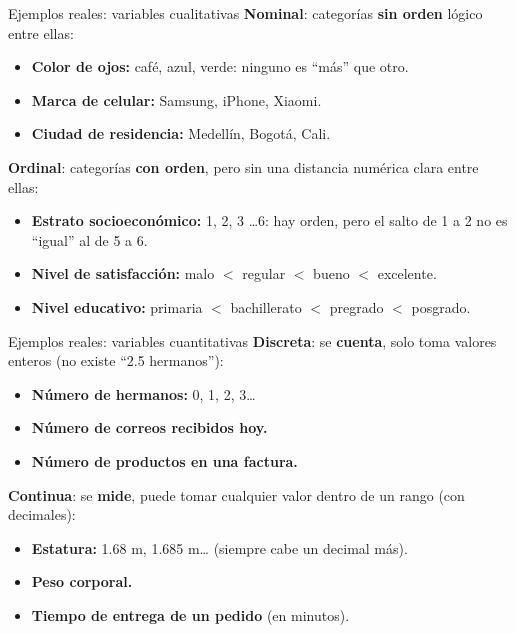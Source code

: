 \documentclass[aspectratio=169,11pt]{beamer}
\begin{document}
\begin{frame}{Ejemplos reales: variables cualitativas}
  \small
  \textcolor{esumerSky}{\textbf{Nominal}}: categorías \textbf{sin orden}
  lógico entre ellas:
  \begin{itemize}
    \small
    \item \textbf{Color de ojos:} café, azul, verde: ninguno es ``más''
      que otro.
    \item \textbf{Marca de celular:} Samsung, iPhone, Xiaomi.
    \item \textbf{Ciudad de residencia:} Medellín, Bogotá, Cali.
  \end{itemize}
  \vspace{0.3cm}
  \textcolor{esumerTeal}{\textbf{Ordinal}}: categorías \textbf{con
  orden}, pero sin una distancia numérica clara entre ellas:
  \begin{itemize}
    \small
    \item \textbf{Estrato socioeconómico:} 1, 2, 3 \dots 6: hay orden,
      pero el salto de 1 a 2 no es ``igual'' al de 5 a 6.
    \item \textbf{Nivel de satisfacción:} malo $<$ regular $<$ bueno $<$
      excelente.
    \item \textbf{Nivel educativo:} primaria $<$ bachillerato $<$
      pregrado $<$ posgrado.
  \end{itemize}
\end{frame}

\begin{frame}{Ejemplos reales: variables cuantitativas}
  \small
  \textcolor{esumerSky}{\textbf{Discreta}}: se \textbf{cuenta}, solo
  toma valores enteros (no existe ``2.5 hermanos''):
  \begin{itemize}
    \small
    \item \textbf{Número de hermanos:} 0, 1, 2, 3\dots
    \item \textbf{Número de correos recibidos hoy.}
    \item \textbf{Número de productos en una factura.}
  \end{itemize}
  \vspace{0.3cm}
  \textcolor{esumerTeal}{\textbf{Continua}}: se \textbf{mide}, puede
  tomar cualquier valor dentro de un rango (con decimales):
  \begin{itemize}
    \small
    \item \textbf{Estatura:} 1.68 m, 1.685 m\dots{} (siempre cabe un
      decimal más).
    \item \textbf{Peso corporal.}
    \item \textbf{Tiempo de entrega de un pedido} (en minutos).
  \end{itemize}
\end{frame}
\end{document}
